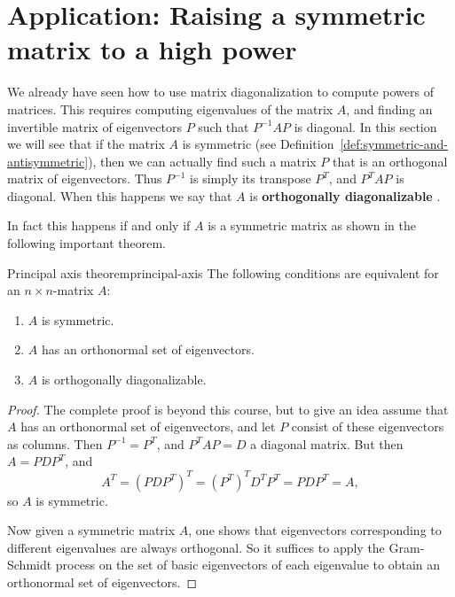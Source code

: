 
\section{Application: Raising a symmetric matrix to a high power}

We already have seen how to use matrix diagonalization to compute
powers of matrices. This requires computing eigenvalues of the matrix
$A$, and finding an invertible matrix of eigenvectors $P$ such that
$P^{-1}AP$ is diagonal. In this section we will see that if the matrix
$A$ is symmetric (see
Definition~\ref{def:symmetric-and-antisymmetric}), then we can
actually find such a matrix $P$ that is an orthogonal matrix of
eigenvectors. Thus $P^{-1}$ is simply its transpose $P^T$, and $P^TAP$
is diagonal. When this happens we say that $A$ is \textbf{orthogonally
  diagonalizable}%
.

In fact this happens if and only if $A$ is a symmetric matrix as shown
in the following important theorem.

\begin{theorem}{Principal axis theorem}{principal-axis}
  The following conditions are equivalent for an $n\times n$-matrix
  $A$:
  \begin{enumerate}
  \item $A$ is symmetric.
  \item $A$ has an orthonormal set of eigenvectors.
  \item $A$ is  orthogonally diagonalizable.
  \end{enumerate}
\end{theorem}

\begin{proof}
  The complete proof is beyond this course, but to give an idea assume
  that $A$ has an orthonormal set of eigenvectors, and let $P$ consist
  of these eigenvectors as columns. Then $P^{-1}=P^T$, and $P^TAP=D$ a
  diagonal matrix. But then $A=PDP^T$, and
  \begin{equation*}
    A^T=(PDP^T)^T = (P^T)^TD^TP^T=PDP^T=A,
  \end{equation*}
  so $A$ is symmetric.

  Now given a symmetric matrix $A$, one shows that eigenvectors
  corresponding to different eigenvalues are always orthogonal. So it
  suffices to apply the Gram-Schmidt process on the set of basic
  eigenvectors of each eigenvalue to obtain an orthonormal set of
  eigenvectors.
\end{proof}

